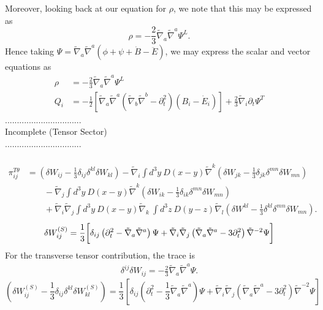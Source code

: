 \documentclass[10pt,letterpaper]{article}
\begin{document}
\\ \\
Moreover, looking back at our equation for $\rho$, we note that this may be expressed as
\begin{equation}
\rho  = -\frac23\tilde\nabla_a\tilde\nabla^a \Psi^L.
\end{equation}
Hence taking $\Psi = \tilde{\nabla}_a\tilde{\nabla}^a (\phi +\psi +\dot{B}-\ddot{E})$, we may express the scalar and vector equations as
\begin{align}
\rho &= -\frac23 \tilde\nabla_a\tilde\nabla^a \Psi^L
\\
Q_i&=-\frac{1}{2}\left[ \tilde{\nabla}_a\tilde{\nabla}^a\left(\tilde{\nabla}_b\tilde{\nabla}^b-\partial_t^2\right)(B_i - \dot{E}_i) \right]
+ \frac23\tilde\nabla_i \partial_t \Psi^T
\end{align}
................................
\\ Incomplete (Tensor Sector)\\
................................
\\ \\
\begin{align}
\pi_{ij}^{T\theta} &=\left(\delta W_{ij} -\frac13 \delta_{ij} \delta^{kl}\delta W_{kl}\right) - \tilde\nabla_i \int d^3y\ D(x-y) \tilde\nabla^k \left(\delta W_{jk} -\frac13 \delta_{jk} \delta^{mn}\delta W_{mn}\right)
\nonumber\\
&\qquad
 - \tilde\nabla_j \int d^3y\ D(x-y) \tilde\nabla^k \left(\delta W_{ik} -\frac13 \delta_{ik} \delta^{mn}\delta W_{mn}\right)
\nonumber\\
&\qquad
+\tilde\nabla_i\tilde\nabla_j \int d^3y\ D(x-y) \tilde\nabla_k\ \int d^3z\ D(y-z) \tilde\nabla_l \left(\delta W^{kl} -\frac13 \delta^{kl} \delta^{mn}\delta W_{mn}\right).
\end{align}
\begin{equation}
 \delta W_{ij}^{(S)} = \frac{1}{3}\bigg{[} \delta_{ij}\left(\partial_t^2-\tilde\nabla_a\tilde\nabla^a\right)\Psi +\tilde{\nabla}_i\tilde{\nabla}_j \left(\tilde{\nabla}_a\tilde{\nabla}^a-3\partial_t^2\right)\tilde\nabla^{-2}\Psi\bigg]
\end{equation}
For the transverse tensor contribution, the trace is
\begin{align}
\delta^{ij}\delta W_{ij} = -\frac23 \tilde\nabla_a\tilde\nabla^a \Psi.
\end{align}
\begin{equation}
\left(\delta W_{ij}^{(S)} -\frac13 \delta_{ij} \delta^{kl}\delta W^{(S)}_{kl}\right) = \frac13\left[
\delta_{ij}\left( \partial_t^2 - \frac13 \tilde\nabla_a\tilde\nabla^a\right)\Psi +\tilde{\nabla}_i\tilde{\nabla}_j \left(\tilde{\nabla}_a\tilde{\nabla}^a-3\partial_t^2\right)\tilde\nabla^{-2}\Psi\right]
\end{equation}
\end{document}
